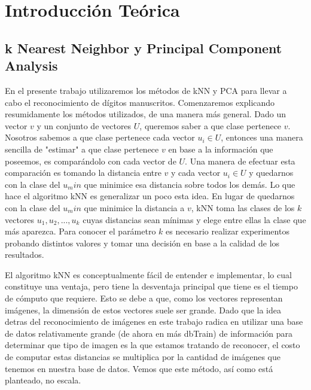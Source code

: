 \section{Introducción Teórica}
%
\subsection{k Nearest Neighbor y Principal Component Analysis}
En el presente trabajo utilizaremos los métodos de kNN y PCA para llevar a cabo el reconocimiento de dígitos manuscritos. Comenzaremos explicando resumidamente los métodos utilizados, de una manera más general. Dado un vector $v$ y un conjunto de vectores $U$, queremos saber a que clase pertenece $v$. Nosotros sabemos a que clase pertenece cada vector $u_i \in U$, entonces una manera sencilla de "estimar" a que clase pertenece $v$ en base a la información que poseemos, es comparándolo con cada vector de $U$. Una manera de efectuar esta comparación es tomando la distancia entre $v$ y cada vector $u_i \in U$ y quedarnos con la clase del $u_min$ que minimice esa distancia sobre todos los demás. Lo que hace el algoritmo kNN es generalizar un poco esta idea. En lugar de quedarnos con la clase del $u_min$ que minimice la distancia a $v$, kNN toma las clases de los $k$ vectores $u_1, u_2, ..., u_k$ cuyas distancias sean mínimas y elege entre ellas la clase que más aparezca. Para conocer el parámetro $k$ es necesario realizar experimentos probando distintos valores y tomar una decisión en base a la calidad de los resultados.
\par El algoritmo kNN es conceptualmente fácil de entender e implementar, lo cual constituye una ventaja, pero tiene la desventaja principal que tiene es el tiempo de cómputo que requiere. Esto se debe a que, como los vectores representan imágenes, la dimensión de estos vectores suele ser grande. Dado que la idea detras del reconocimiento de imágenes en este trabajo radica en utilizar una base de datos relativamente grande (de ahora en más dbTrain) de información para determinar que tipo de imagen es la que estamos tratando de reconocer, el costo de computar estas distancias se multiplica por la cantidad de imágenes que tenemos en nuestra base de datos. Vemos que este método, así como está planteado, no escala.

